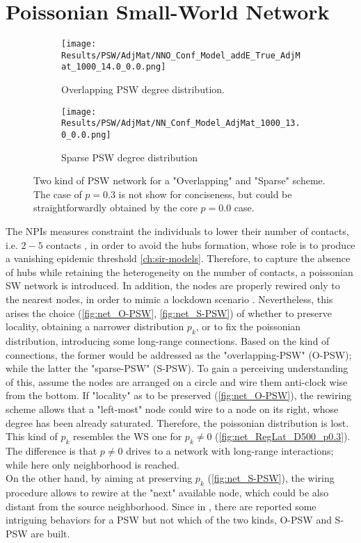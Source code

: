 \documentclass[a4paper,10pt,twoside]{book} %
\theoremstyle{definition}
\begin{document}
\clearpage
\section{Poissonian Small-World Network}
\begin{figure}[ht]
    \begin{subfigure}{.45\linewidth}
        \texttt{[image: Results/PSW/AdjMat/NNO\_Conf\_Model\_addE\_True\_AdjMat\_1000\_14.0\_0.0.png]}
        \centering
        \caption{Overlapping PSW degree distribution. }
        \label{fig:net_O-PSW}
    \end{subfigure}
	\hfill
	\begin{subfigure}{.45\linewidth}
        \texttt{[image: Results/PSW/AdjMat/NN\_Conf\_Model\_AdjMat\_1000\_13.0\_0.0.png]}
        \centering
        \caption{Sparse PSW degree distribution}
        \label{fig:net_S-PSW}
    \end{subfigure}
	\caption{Two kind of PSW network for a "Overlapping" and "Sparse" scheme. The case of $p = 0.3$ is not show for conciseness, but could be straightforwardly obtained by the core $p = 0.0$ case.}
\end{figure}
The NPIs measures constraint the individuals to lower their number of contacts, i.e. $2-5$ contacts \cite{Liu::2021_Review_SContactPattern}, in order to avoid the hubs formation, whose role is to produce a vanishing epidemic threshold \autoref{ch:sir-models}.
Therefore, to capture the absence of hubs while retaining the heterogeneity on the number of contacts, a poissonian SW network is introduced. In addition, the nodes are properly rewired only to the nearest nodes, in order to mimic a lockdown scenario \cite{Thurner::Appendix_NetBasedExpl}. Nevertheless, this arises the choice (\autoref{fig:net_O-PSW}, \autoref{fig:net_S-PSW}) of whether to preserve locality, obtaining a narrower distribution $p_k$, or to fix the poissonian distribution, introducing some long-range connections. Based on the kind of connections, the former would be addressed as the "overlapping-PSW" (O-PSW); while the latter the "sparse-PSW" (S-PSW). To gain a perceiving understanding of this, assume the nodes are arranged on a circle and wire them anti-clock wise from the bottom. If "locality" as to be preserved (\autoref{fig:net_O-PSW}), the rewiring scheme allows that a "left-most" node could wire to a node on its right, whose degree has been already saturated. Therefore, the poissonian distribution is lost. This kind of $ p_k$ resembles the WS one for $ p_k \neq 0$ (\autoref{fig:net_RegLat_D500_p0.3}). The difference is that $ p \neq 0$ drives to a network with long-range interactions; while here only neighborhood is reached.\\
On the other hand, by aiming at preserving $p_k$  (\autoref{fig:net_S-PSW}), the wiring procedure allows to rewire at the "next" available node, which could be also distant from the source neighborhood. Since in \cite{Thurner::Appendix_NetBasedExpl}, there are reported some intriguing behaviors for a PSW but not which of the two kinds, O-PSW and S-PSW are built.
\end{document}

